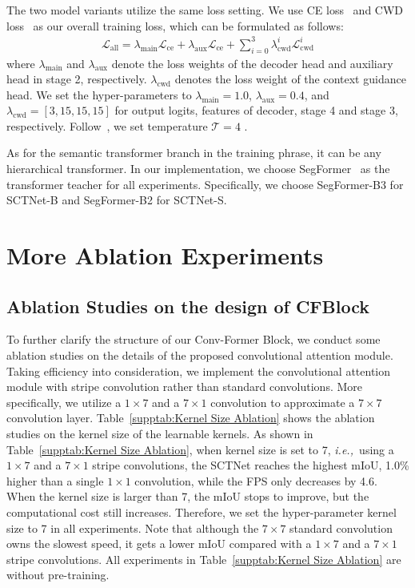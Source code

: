 \documentclass[letterpaper]{article} %
\def\ie{{\it{i.e.,~}}}
\begin{document}
 The two model variants utilize the same loss setting. We use CE loss~\cite{milletari2016v} and CWD loss~\cite{shu2021channel} as our overall training loss, which can be formulated as follows:
\begin{equation}\label{Eq:TrainingLoss}
\begin{aligned}
\mathcal{L}_{\text{all}} = \lambda_{\text{main}}\mathcal{L}_{\text{ce}} + \lambda_{\text{aux}}\mathcal{L}_{\text{ce}} + \sum_{i=0}^{3}\lambda_{\text{cwd}}^{i}\mathcal{L}_{\text{cwd}}^{i}
\end{aligned}
\end{equation}
where $\lambda_{\text{main}}$ and $\lambda_{\text{aux}}$ denote the loss weights of the decoder head and auxiliary head in stage 2, respectively. $\lambda_{\text{cwd}}$ denotes the loss weight of the context guidance head. We set the hyper-parameters to $\lambda_{\text{main}} = 1.0$, $\lambda_{\text{aux}} = 0.4$, and $\lambda_{\text{cwd}} = [3,15,15,15]$ for output logits, features of decoder, stage 4 and stage 3, respectively. Follow~\cite{shu2021channel}, we set temperature $\mathcal{T} = 4$ .

As for the semantic transformer branch in the training phrase, it can be any hierarchical transformer. In our implementation, we choose SegFormer~\cite{xie2021segformer} as the transformer teacher for all experiments. Specifically, we choose SegFormer-B3 for SCTNet-B and SegFormer-B2 for SCTNet-S.




\section{More Ablation Experiments}\label{section:B}
\subsection{Ablation Studies on the design of CFBlock}
To further clarify the structure of our Conv-Former Block, we conduct some ablation studies on the details of the proposed convolutional attention module. Taking efficiency into consideration, we implement the convolutional attention module with stripe convolution rather than standard convolutions. More specifically, we utilize a $1 \times 7$ and a $7 \times 1$ convolution to approximate a $7 \times 7$ convolution layer. Table~\ref{supptab:Kernel Size Ablation} shows the ablation studies on the kernel size of the learnable kernels. As shown in Table~\ref{supptab:Kernel Size Ablation}, when kernel size is set to 7, \ie using a $1 \times 7$ and a $7 \times 1$ stripe convolutions, the SCTNet reaches the highest mIoU, 1.0\% higher than a single $1 \times 1$ convolution, while the FPS only decreases by 4.6. When the kernel size is larger than 7, the mIoU stops to improve, but the computational cost still increases. Therefore, we set the hyper-parameter kernel size to 7 in all experiments. Note that although the $7 \times 7$ standard convolution owns the slowest speed, it gets a lower mIoU compared with a $1 \times 7$ and a $7 \times 1$ stripe convolutions. All experiments in Table~\ref{supptab:Kernel Size Ablation} are without pre-training.
\end{document}
